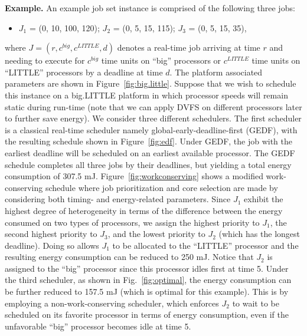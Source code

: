\vspace{2mm}
\noindent \textbf{Example.}
An example job set instance is comprised of the following three jobs:
\begin{itemize}
\item $J_1$ = (0, 10, 100, 120); $J_2$ = (0, 5, 15, 115); $J_3$ = (0, 5, 15, 35),
\end{itemize}
 where $J = (r, c^{big}, c^{LITTLE}, d)$ denotes a real-time job arriving at time $r$ and needing to execute for $c^{big}$ time units on ``big'' processors or $c^{LITTLE}$ time units on ``LITTLE'' processors by a deadline at time $d$. 
 The platform associated parameters are shown in Figure~\ref{fig:big.little}. Suppose that we wish to schedule this instance on a big.LITTLE platform in which processor speeds will remain static during run-time (note that we can apply  DVFS on different processors later to further save energy). We consider three different schedulers. The first scheduler is a classical real-time scheduler namely global-early-deadline-first (GEDF), with the resulting schedule shown in Figure~\ref{fig:edf}. Under GEDF, the job with the earliest deadline will be scheduled on an earliest available processor. The GEDF schedule completes all three jobs by their deadlines, but yielding a total energy consumption of 307.5 mJ. Figure~\ref{fig:workconserving} shows a modified work-conserving schedule where job prioritization and core selection are made by considering both timing- and energy-related parameters. Since $J_1$ exhibit the highest degree of heterogeneity in terms of the difference between the energy consumed on two types of processors, we assign the highest priority to $J_1$, the second highest priority to $J_3$, and the lowest priority to $J_2$ (which has the longest deadline). Doing so allows $J_1$ to be allocated to the ``LITTLE'' processor and the resulting energy consumption can be reduced to 250 mJ. Notice that $J_2$ is assigned to the ``big'' processor since this processor idles first at time 5. Under the third scheduler, as shown in Fig.~\ref{fig:optimal}, the energy consumption can be further reduced to 157.5 mJ (which is optimal for this example). This is by employing a non-work-conserving scheduler, which enforces $J_2$ to wait to be scheduled on its favorite processor in terms of energy consumption, even if the unfavorable ``big'' processor becomes idle at time 5.



